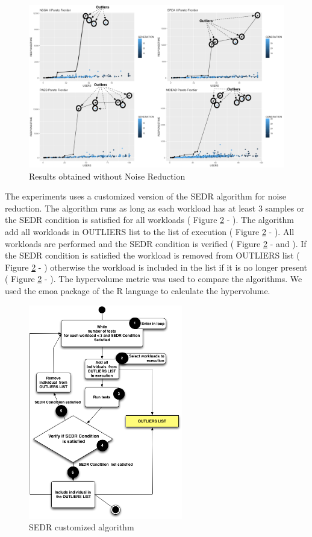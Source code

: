 \documentclass[espaco=umemeio,chapter=TITLE,twoside,openright]{abnt}
\begin{document}
\begin{figure}[!h]
\centering
\includegraphics[width=1\textwidth]{./images/outliers.png}
\caption{Results obtained without Noise Reduction}
\label{fig:outliers}
\end{figure}

The experiments uses a customized version of the SEDR algorithm for noise reduction. The algorithm runs as long as each workload has at least 3 samples or the SEDR condition is satisfied for all workloads ( Figure \ref{fig:sedrcustomized} - ). The algorithm add all workloads in OUTLIERS list to the list of execution ( Figure \ref{fig:sedrcustomized} - ). All workloads are performed and the SEDR condition is verified  ( Figure \ref{fig:sedrcustomized} -  and  ). If the SEDR condition is satisfied the workload is removed from OUTLIERS list ( Figure \ref{fig:sedrcustomized} - ) otherwise the workload is included in the list if it is no longer present ( Figure \ref{fig:sedrcustomized} - ). The hypervolume metric was used to compare the algorithms. We used the emoa package of the R language to calculate the hypervolume.

\begin{figure}[!h]
\centering
\includegraphics[width=0.6\textwidth]{./images/suspectlist.png}
\caption{SEDR customized algorithm}
\label{fig:sedrcustomized}
\end{figure}
\end{document}
